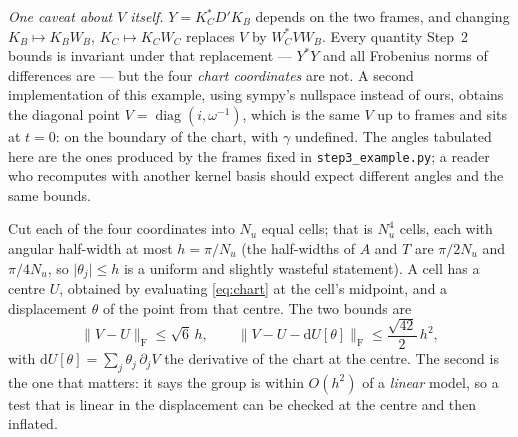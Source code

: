 \documentclass[11pt]{article}
\newcommand{\abs}[1]{\lvert #1\rvert}
\newcommand{\norm}[1]{\lVert #1\rVert}
\newcommand{\Frob}{\mathrm{F}}
\newcommand{\key}[1]{\par\smallskip\noindent{\bfseries #1}\par\nobreak\vspace{-2pt}}
\begin{document}
\emph{One caveat about $V$ itself.} $Y=K_C^*D'K_B$ depends on the two frames, and changing
$K_B\mapsto K_BW_B$, $K_C\mapsto K_CW_C$ replaces $V$ by $W_C^*VW_B$. Every quantity Step~2 bounds is
invariant under that replacement --- $Y^*Y$ and all Frobenius norms of differences are --- but the four
\emph{chart coordinates} are not. A second implementation of this example, using sympy's nullspace
instead of ours, obtains the diagonal point $V=\operatorname{diag}(i,\omega^{-1})$, which is the same
$V$ up to frames and sits at $t=0$: on the boundary of the chart, with $\gamma$ undefined. The angles
tabulated here are the ones produced by the frames fixed in \texttt{step3\_example.py}; a reader who
recomputes with another kernel basis should expect different angles and the same bounds.

\key{2.\ Cutting the group into cells}
Cut each of the four coordinates into $N_u$ equal cells; that is $N_u^4$ cells, each with angular
half-width at most $h=\pi/N_u$ (the half-widths of $A$ and $T$ are $\pi/2N_u$ and $\pi/4N_u$, so
$\abs{\theta_j}\le h$ is a uniform and slightly wasteful statement). A cell has a centre $U$, obtained
by evaluating \eqref{eq:chart} at the cell's midpoint, and a displacement $\theta$ of the point from
that centre. The two bounds are
\begin{equation}\label{eq:taylor}
\norm{V-U}_{\Frob}\le\sqrt6\,h,
\qquad
\norm{V-U-\mathrm dU[\theta]}_{\Frob}\le\frac{\sqrt{42}}{2}\,h^2 ,
\end{equation}
with $\mathrm dU[\theta]=\sum_j\theta_j\,\partial_jV$ the derivative of the chart at the centre. The
second is the one that matters: it says the group is within $O(h^2)$ of a \emph{linear} model, so a
test that is linear in the displacement can be checked at the centre and then inflated.
\end{document}
